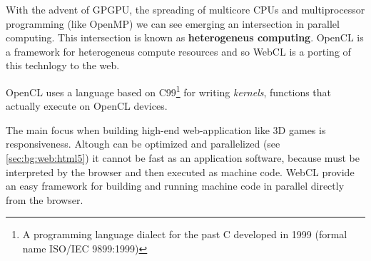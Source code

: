 
With the advent of \ac{GPGPU}, the spreading of multicore CPUs and multiprocessor programming (like OpenMP)
we can see emerging an intersection in parallel computing. This intersection is known as
\textbf{heterogeneus computing}. \ac{OpenCL} is a framework for heterogeneus compute resources and so
\ac{WebCL} is a porting of this technlogy to the web.

\ac{OpenCL} uses a language based on C99\footnote{A programming language dialect for the past C developed in
1999 (formal name ISO/IEC 9899:1999)} for writing \emph{kernels}, functions that actually execute on OpenCL
devices. 

The main focus when building high-end web-application like 3D games is responsiveness. Altough \js{}
can be optimized and parallelized (see \vref{sec:bg:web:html5}) it cannot be fast as an application
software, because \js{} must be interpreted by the browser and then executed as machine code. \ac{WebCL}
provide an easy framework for building and running machine code in parallel directly from the browser.

